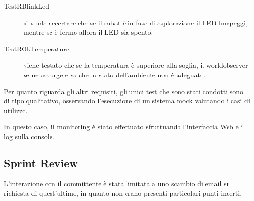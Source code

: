 \begin{description}
  \item[TestRBlinkLed]
    si vuole accertare che se il robot è in fase di esplorazione il LED lmapeggi, mentre se è fermo allora il LED sia spento.
  \item[TestROkTemperature]
    viene testato che se la temperatura è superiore alla soglia, il worldobserver se ne accorge e sa che lo stato dell'ambiente non è adeguato.
\end{description}

Per quanto riguarda gli altri requisiti, gli unici test che sono stati condotti sono di tipo qualitativo, osservando l'esecuzione di un sistema mock valutando i casi di utilizzo.

In questo caso, il monitoring è stato effettuato sfruttuando l'interfaccia Web e i log sulla console.

\subsection{Sprint Review}

L'interazione con il committente è stata limitata a uno scambio di email su richiesta di quest'ultimo, in quanto non erano presenti particolari punti incerti.
